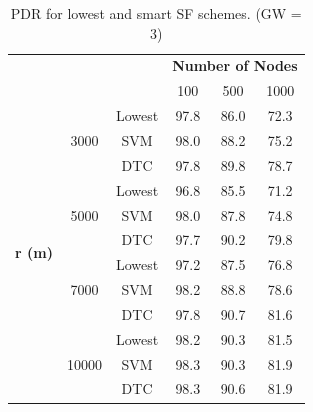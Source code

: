 \documentclass[conference]{IEEEtran}
\begin{document}
\begin{table}
\centering
\caption{PDR for lowest and smart SF schemes. (GW = 3)}
\label{table:prediction_pdr}
\begin{tabular}{|c|c|c|c|c|c|}
\hline
\multicolumn{3}{|c|}{\multirow{2}{*}{}}                            & \multicolumn{3}{c|}{\textbf{Number of Nodes}} \\ \cline{4-6}
\multicolumn{3}{|c|}{}                                             & 100           & 500           & 1000          \\ \hline
\multirow{12}{*}{\textbf{r (m)}} & \multirow{3}{*}{3000}  & Lowest & 97.8          & 86.0          & 72.3          \\ \cline{3-6}
                                 &                        & SVM    & 98.0          & 88.2          & 75.2          \\ \cline{3-6}
                                 &                        & DTC    & 97.8          & 89.8          & 78.7          \\ \cline{2-6}

                                 & \multirow{3}{*}{5000}  & Lowest & 96.8          & 85.5          & 71.2          \\ \cline{3-6}
                                 &                        & SVM    & 98.0          & 87.8          & 74.8          \\ \cline{3-6}
                                 &                        & DTC    & 97.7          & 90.2          & 79.8          \\ \cline{2-6}

                                 & \multirow{3}{*}{7000}  & Lowest & 97.2          & 87.5          & 76.8          \\ \cline{3-6}
                                 &                        & SVM    & 98.2          & 88.8          & 78.6          \\ \cline{3-6}
                                 &                        & DTC    & 97.8          & 90.7          & 81.6          \\ \cline{2-6}

                                 & \multirow{3}{*}{10000} & Lowest & 98.2          & 90.3          & 81.5          \\ \cline{3-6}
                                 &                        & SVM    & 98.3          & 90.3          & 81.9          \\ \cline{3-6}
                                 &                        & DTC    & 98.3          & 90.6          & 81.9          \\ \hline
\end{tabular}
\end{table}
\end{document}

